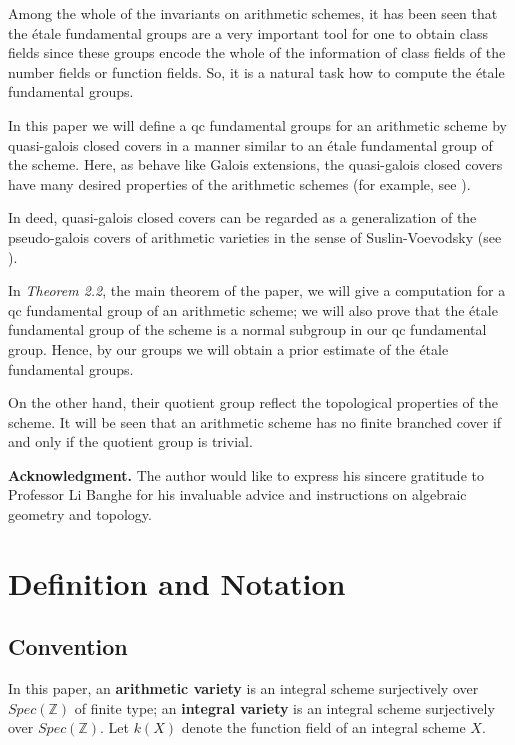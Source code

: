\documentclass[12pt,twoside,reqno]{amsart}
\theoremstyle{definition}
\numberwithin{equation}{section}
\begin{document}
Among the whole of the invariants on arithmetic schemes, it has been seen that the \'{e}tale fundamental groups are a very important tool for one to obtain class fields since these groups encode the
whole of the
information of class fields of the number fields or function fields. So, it is a natural task how to compute the \'{e}tale fundamental groups.

In this paper we will define a qc fundamental groups for an arithmetic scheme
 by quasi-galois closed covers in a manner similar to an \'{e}tale fundamental group of the scheme.
Here, as behave like Galois extensions, the quasi-galois closed covers have many desired properties of the arithmetic schemes (for example, see \cite{An2,An3}).

In deed, quasi-galois closed covers can be
regarded as a generalization of the pseudo-galois covers of arithmetic
varieties in the sense of Suslin-Voevodsky (see \cite{VS1,SV2}).

In \emph{Theorem 2.2}, the main theorem of the paper,
we will give a computation for  a qc fundamental group of an arithmetic scheme; we will also prove that the \'{e}tale fundamental group of the scheme is a normal subgroup in our qc fundamental group. Hence, by our groups we will obtain a prior estimate of the \'{e}tale fundamental groups.

On the other hand, their quotient group reflect the topological properties of the scheme. It will be seen that an arithmetic scheme has no finite branched cover if and only if the quotient group is trivial.

\textbf{Acknowledgment.} The author would like to express his sincere
gratitude to Professor Li Banghe for his invaluable advice and instructions
on algebraic geometry and topology.



\section{Definition and Notation}

\subsection{Convention}

In this paper, an \textbf{arithmetic variety}
is an integral scheme surjectively over $Spec\left( \mathbb{Z}\right) $ of finite type; an \textbf{integral variety} is an  integral
scheme surjectively over $Spec\left( \mathbb{Z}\right) $.
Let $k(X)$ denote the function field of an integral scheme $X$.
\end{document}
